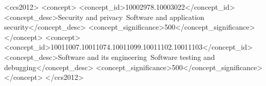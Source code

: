 \documentclass[manuscript,screen,review,anonymous]{acmart}
\begin{document}
\title{\papertitle}

\author{\authorAname}
\email{\authorAemail}



\begin{CCSXML}
<ccs2012>
   <concept>
       <concept_id>10002978.10003022</concept_id>
       <concept_desc>Security and privacy~Software and application security</concept_desc>
       <concept_significance>500</concept_significance>
       </concept>
   <concept>
       <concept_id>10011007.10011074.10011099.10011102.10011103</concept_id>
       <concept_desc>Software and its engineering~Software testing and debugging</concept_desc>
       <concept_significance>500</concept_significance>
       </concept>
 </ccs2012>
\end{CCSXML}




\maketitle






\appendix
\end{document}
